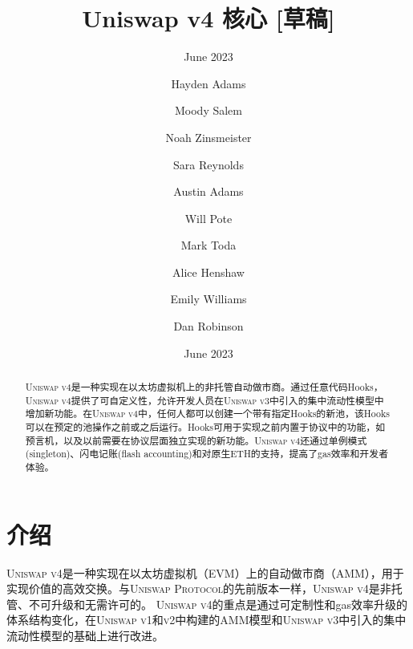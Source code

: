 \documentclass[sigconf,nonacm,prologue,table]{acmart}
\numberwithin{equation}{section}
\theoremstyle{definition}
\theoremstyle{remark}
\begin{document}
\title{Uniswap v4 核心 [草稿]}
\subtitle{June 2023}
\date{June 2023}

\author{Hayden Adams}
\affiliation{}

\author{Moody Salem}
\affiliation{}

\author{Noah Zinsmeister}
\affiliation{}

\author{Sara Reynolds}
\affiliation{}

\author{Austin Adams}
\affiliation{}

\author{Will Pote}
\affiliation{}

\author{Mark Toda}
\affiliation{}

\author{Alice Henshaw}
\affiliation{}

\author{Emily Williams}
\affiliation{}

\author{Dan Robinson}
\affiliation{}


\begin{teaserfigure}
\caption*{
    \hspace{\textwidth}
    }
\end{teaserfigure}

\renewcommand{\shortauthors}{Adams et al.}

\begin{abstract}

\textsc{Uniswap v4}是一种实现在以太坊虚拟机上的非托管自动做市商。通过任意代码Hooks，\textsc{Uniswap v4}提供了可自定义性，允许开发人员在\textsc{Uniswap v3}中引入的集中流动性模型中增加新功能。在\textsc{Uniswap v4}中，任何人都可以创建一个带有指定Hooks的新池，该Hooks可以在预定的池操作之前或之后运行。Hooks可用于实现之前内置于协议中的功能，如预言机，以及以前需要在协议层面独立实现的新功能。\textsc{Uniswap v4}还通过单例模式(singleton)、闪电记账(flash accounting)和对原生ETH的支持，提高了gas效率和开发者体验。
\end{abstract}

\maketitle

\section{介绍} \label{sec:introduction}
\textsc{Uniswap v4}是一种实现在以太坊虚拟机（EVM）上的自动做市商（AMM），用于实现价值的高效交换。与\textsc{Uniswap Protocol}的先前版本一样，\textsc{Uniswap v4}是非托管、不可升级和无需许可的。 \textsc{Uniswap v4}的重点是通过可定制性和gas效率升级的体系结构变化，在\textsc{Uniswap v1}和\textsc{v2}中构建的AMM模型和\textsc{Uniswap v3}中引入的集中流动性模型的基础上进行改进。
\end{document}
